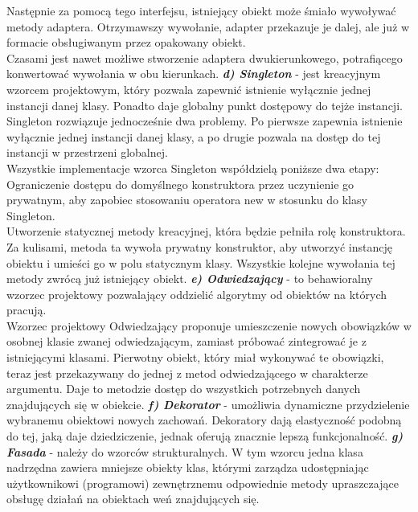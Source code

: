Następnie za pomocą tego interfejsu, istniejący obiekt może śmiało wywoływać metody adaptera.
Otrzymawszy wywołanie, adapter przekazuje je dalej, ale już w formacie obsługiwanym przez opakowany obiekt.
\\Czasami jest nawet możliwe stworzenie adaptera dwukierunkowego, potrafiącego konwertować wywołania w obu kierunkach.
\newline\textbf{\textit{d) Singleton}} - jest kreacyjnym wzorcem projektowym, który pozwala zapewnić istnienie wyłącznie jednej instancji danej klasy. Ponadto daje globalny punkt dostępowy do tejże instancji. Singleton rozwiązuje jednocześnie dwa problemy. Po pierwsze zapewnia istnienie wyłącznie jednej instancji danej klasy, a po drugie pozwala na dostęp do tej instancji w przestrzeni globalnej.
\\Wszystkie implementacje wzorca Singleton współdzielą poniższe dwa etapy:
\\Ograniczenie dostępu do domyślnego konstruktora przez uczynienie go prywatnym, aby zapobiec stosowaniu operatora new w stosunku do klasy Singleton.
\\Utworzenie statycznej metody kreacyjnej, która będzie pełniła rolę konstruktora. Za kulisami, metoda ta wywoła prywatny konstruktor, aby utworzyć instancję obiektu i umieści go w polu statycznym klasy. Wszystkie kolejne wywołania tej metody zwrócą już istniejący obiekt.
\newline\textbf{\textit{e) Odwiedzający}} - to behawioralny wzorzec projektowy pozwalający oddzielić algorytmy od obiektów na których pracują.
\\Wzorzec projektowy Odwiedzający proponuje umieszczenie nowych obowiązków w osobnej klasie zwanej odwiedzającym, zamiast próbować zintegrować je z istniejącymi klasami. Pierwotny obiekt, który miał wykonywać te obowiązki, teraz jest przekazywany do jednej z metod odwiedzającego w charakterze argumentu. Daje to metodzie dostęp do wszystkich potrzebnych danych znajdujących się w obiekcie.
\newline\textbf{\textit{f) Dekorator}} - umożliwia dynamiczne przydzielenie wybranemu obiektowi nowych zachowań. Dekoratory dają elastyczność podobną do tej, jaką daje dziedziczenie, jednak oferują znacznie lepszą funkcjonalność.
\newline\textbf{\textit{g) Fasada}} - należy do wzorców strukturalnych. W tym wzorcu jedna klasa nadrzędna zawiera mniejsze obiekty klas, którymi zarządza udostępniając użytkownikowi (programowi) zewnętrznemu odpowiednie metody upraszczające obsługę działań na obiektach weń znajdujących się.
